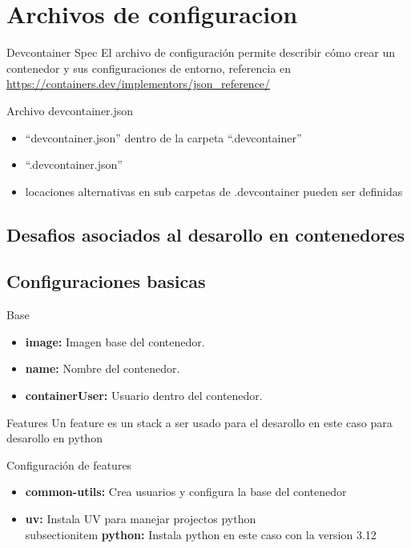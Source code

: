 \documentclass{beamer}
\begin{document}
\section{Archivos de configuracion}
\begin{frame}{Devcontainer Spec}
  El archivo de configuración permite describir cómo crear un contenedor y sus configuraciones de entorno, referencia en \href{https://containers.dev/implementors/json_reference/}{https://containers.dev/implementors/json\_reference/}
  \begin{block}{Archivo devcontainer.json}
    \begin{itemize}
      \item “devcontainer.json” dentro de la carpeta “.devcontainer”
      \item “.devcontainer.json”
      \item locaciones alternativas en sub carpetas de .devcontainer pueden ser definidas
    \end{itemize}
  \end{block}
\end{frame}
\subsection{Desafios asociados al desarollo en contenedores}
\subsection{Configuraciones basicas}
\begin{frame}{\subsecname}
  
  \begin{block}{Base}
    \begin{itemize}
      \item \textbf{image:} Imagen base del contenedor.
      \item \textbf{name:} Nombre del contenedor.
      \item \textbf{containerUser:} Usuario dentro del contenedor.
    \end{itemize}
  \end{block}
\end{frame}
\begin{frame}{Features}
  Un feature es un stack a ser usado para el desarollo en este caso para desarollo en python
  
  \begin{block}{Configuración de features}
    \begin{itemize}
      \item \textbf{common-utils:} Crea usuarios y configura la base del contenedor
      \item \textbf{uv:} Instala UV para manejar projectos python
      \\subsection{}item \textbf{python:} Instala python en este caso con la version 3.12
    \end{itemize}
  \end{block}
\end{frame}
\end{document}
